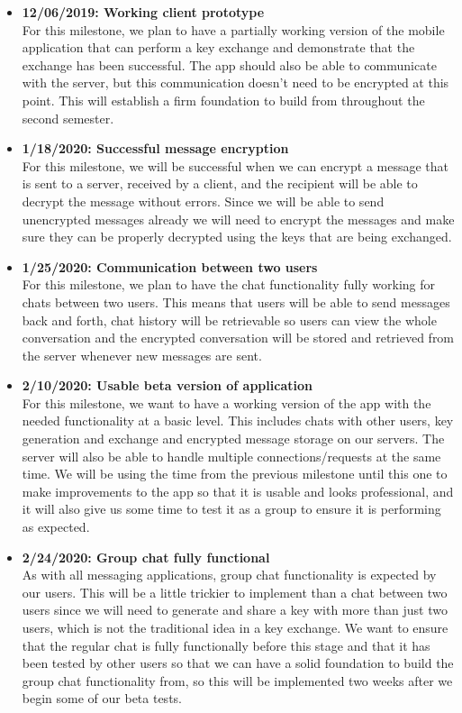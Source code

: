 \documentclass[11pt]{article}
\begin{document}
\begin{itemize}
	\item{\textbf{12/06/2019: Working client prototype}\\
	    For this milestone, we plan to have a partially working version of the mobile application that can perform a key exchange and demonstrate that the exchange has been successful. The app should also be able to communicate with the server, but this communication doesn’t need to be encrypted at this point. This will establish a firm foundation to build from throughout the second semester.}
	\item{\textbf{1/18/2020: Successful message encryption}\\
    For this milestone, we will be successful when we can encrypt a message that is sent to a server, received by a client, and the recipient will be able to decrypt the message without errors. Since we will be able to send unencrypted messages already we will need to encrypt the messages and make sure they can be properly decrypted using the keys that are being exchanged.}
    \item{\textbf{1/25/2020: Communication between two users}\\
    For this milestone, we plan to have the chat functionality fully working for chats between two users. This means that users will be able to send messages back and forth, chat history will be retrievable so users can view the whole conversation and the encrypted conversation will be stored and retrieved from the server whenever new messages are sent.}
    \item{\textbf{2/10/2020: Usable beta version of application}\\
    For this milestone, we want to have a working version of the app with the needed functionality at a basic level. This includes chats with other users, key generation and exchange and encrypted message storage on our servers. The server will also be able to handle multiple connections/requests at the same time. We will be using the time from the previous milestone until this one to make improvements to the app so that it is usable and looks professional, and it will also give us some time to test it as a group to ensure it is performing as expected.}
    \item{\textbf{2/24/2020: Group chat fully functional}\\
    As with all messaging applications, group chat functionality is expected by our users. This will be a little trickier to implement than a chat between two users since we will need to generate and share a key with more than just two users, which is not the traditional idea in a key exchange. We want to ensure that the regular chat is fully functionally before this stage and that it has been tested by other users so that we can have a solid foundation to build the group chat functionality from, so this will be implemented two weeks after we begin some of our beta tests.}

\end{itemize}
\end{document}
